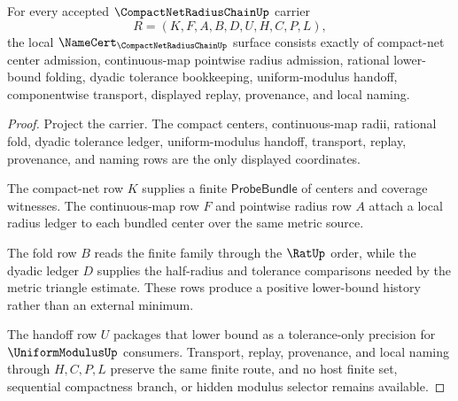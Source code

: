 \begin{theorem}
\label{thm:compact-net-radius-chain-namecert-obligations}
For every accepted $\CompactNetRadiusChainUp$ carrier
$$
R=(K,F,A,B,D,U,H,C,P,L),
$$
the local $\NameCert_{\CompactNetRadiusChainUp}$ surface consists exactly of compact-net center admission, continuous-map pointwise radius admission, rational lower-bound folding, dyadic tolerance bookkeeping, uniform-modulus handoff, componentwise transport, displayed replay, provenance, and local naming.
\end{theorem}
\begin{proof}
Project the carrier. The compact centers, continuous-map radii, rational fold, dyadic tolerance ledger, uniform-modulus handoff, transport, replay, provenance, and naming rows are the only displayed coordinates.

The compact-net row $K$ supplies a finite $\mathsf{ProbeBundle}$ of centers and coverage witnesses. The continuous-map row $F$ and pointwise radius row $A$ attach a local radius ledger to each bundled center over the same metric source.

The fold row $B$ reads the finite family through the $\RatUp$ order, while the dyadic ledger $D$ supplies the half-radius and tolerance comparisons needed by the metric triangle estimate. These rows produce a positive lower-bound history rather than an external minimum.

The handoff row $U$ packages that lower bound as a tolerance-only precision for $\UniformModulusUp$ consumers. Transport, replay, provenance, and local naming through $H,C,P,L$ preserve the same finite route, and no host finite set, sequential compactness branch, or hidden modulus selector remains available.
\end{proof}

\begin{closurestatus}{\CompactNetRadiusChainUp}
  \theoryclosure{\seedClosure}
  \formalstatus{\unformalizedV}
\end{closurestatus}
